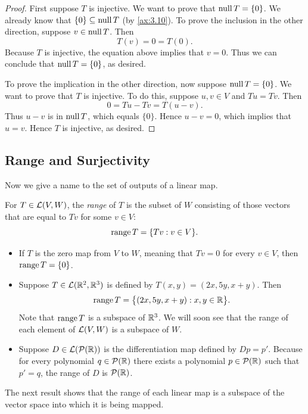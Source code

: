 \begin{proof}
First suppose $T$ is injective. We want to prove that $\operatorname{null} T=\{0\}$. We
already know that $\{0\}\subseteq\operatorname{null} T$ (by \ref{ax:3.10}). To prove the
inclusion in the other direction, suppose $v\in\operatorname{null} T$. Then
\[ T(v)=0=T(0). \]
Because $T$ is injective, the equation above implies that $v=0$. Thus we can
conclude that $\operatorname{null} T=\{0\}$, as desired.

To prove the implication in the other direction, now suppose
$\operatorname{null} T=\{0\}$. We want to prove that $T$ is injective. To do this, suppose
$u,v\in V$ and $Tu=Tv$. Then
\[ 0=Tu-Tv=T(u-v). \]
Thus $u-v$ is in $\operatorname{null} T$, which equals $\{0\}$. Hence $u-v=0$, which
implies that $u=v$. Hence $T$ is injective, as desired.
\end{proof}

\subsection{Range and Surjectivity}

Now we give a name to the set of outputs of a linear map.

\begin{definition}[Range]\label{ax:3.16}
For $T\in\mathcal{L}(V,W)$, the \emph{range} of $T$ is the subset of $W$ consisting
of those vectors that are equal to $Tv$ for some $v\in V$:
\[ \operatorname{range} T=\{Tv : v\in V\}. \]
\end{definition}

\begin{example}[Range]\label{ax:3.17}\leavevmode
\begin{itemize}
\item If $T$ is the zero map from $V$ to $W$, meaning that $Tv=0$ for every
  $v\in V$, then $\operatorname{range} T=\{0\}$.
\item Suppose $T\in\mathcal{L}(\mathbb{R}^2,\mathbb{R}^3)$ is defined by $T(x,y)=(2x,5y,x+y)$. Then
  \[ \operatorname{range} T=\bigl\{(2x,5y,x+y) : x,y\in\mathbb{R}\bigr\}. \]
  Note that $\operatorname{range} T$ is a subspace of $\mathbb{R}^3$. We will soon see that the
  range of each element of $\mathcal{L}(V,W)$ is a subspace of $W$.
\item Suppose $D\in\mathcal{L}(\mathcal{P}(\mathbb{R}))$ is the differentiation map defined by
  $Dp=p'$. Because for every polynomial $q\in\mathcal{P}(\mathbb{R})$ there exists a
  polynomial $p\in\mathcal{P}(\mathbb{R})$ such that $p'=q$, the range of $D$ is
  $\mathcal{P}(\mathbb{R})$.
\end{itemize}
\end{example}

The next result shows that the range of each linear map is a subspace of the
vector space into which it is being mapped.


